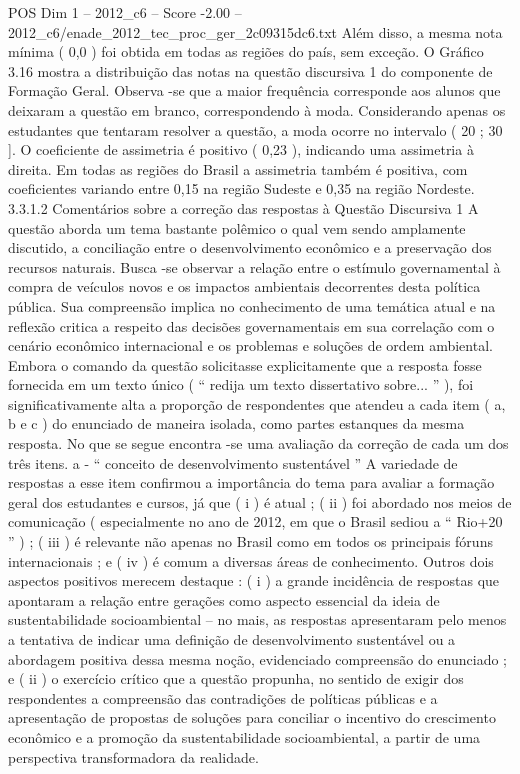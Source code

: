 \begin{textsample}{POS Dim 1 – 2012\_c6 – Score -2.00 – 2012\_c6/enade\_2012\_tec\_proc\_ger\_2c09315dc6.txt}
Além disso, a mesma nota mínima ( 0,0 ) foi obtida em todas as regiões do país, sem exceção.
O Gráfico 3.16 mostra a distribuição das notas na questão discursiva 1 do componente de Formação Geral.
Observa -se que a maior frequência corresponde aos alunos que deixaram a questão em branco, correspondendo à moda.
Considerando apenas os estudantes que tentaram resolver a questão, a moda ocorre no intervalo ( 20 ; 30 ].
O coeficiente de assimetria é positivo ( 0,23 ), indicando uma assimetria à direita.
Em todas as regiões do Brasil a assimetria também é positiva, com coeficientes variando entre 0,15 na região Sudeste e 0,35 na região Nordeste. 3.3.1.2 Comentários sobre a correção das respostas à Questão Discursiva 1 A questão aborda um tema bastante polêmico o qual vem sendo amplamente discutido, a conciliação entre o desenvolvimento econômico e a preservação dos recursos naturais.
Busca -se observar a relação entre o estímulo governamental à compra de veículos novos e os impactos ambientais decorrentes desta política pública.
Sua compreensão implica no conhecimento de uma temática atual e na reflexão critica a respeito das decisões governamentais em sua correlação com o cenário econômico internacional e os problemas e soluções de ordem ambiental.
Embora o comando da questão solicitasse explicitamente que a resposta fosse fornecida em um texto único ( “ redija um texto dissertativo sobre... ” ), foi significativamente alta a proporção de respondentes que atendeu a cada item ( a, b e c ) do enunciado de maneira isolada, como partes estanques da mesma resposta.
No que se segue encontra -se uma avaliação da correção de cada um dos três itens. a - “ conceito de desenvolvimento sustentável ” A variedade de respostas a esse item confirmou a importância do tema para avaliar a formação geral dos estudantes e cursos, já que ( i ) é atual ; ( ii ) foi abordado nos meios de comunicação ( especialmente no ano de 2012, em que o Brasil sediou a “ Rio+20 ” ) ; ( iii ) é relevante não apenas no Brasil como em todos os principais fóruns internacionais ; e ( iv ) é comum a diversas áreas de conhecimento.
Outros dois aspectos positivos merecem destaque : ( i ) a grande incidência de respostas que apontaram a relação entre gerações como aspecto essencial da ideia de sustentabilidade socioambiental – no mais, as respostas apresentaram pelo menos a tentativa de indicar uma definição de desenvolvimento sustentável ou a abordagem positiva dessa mesma noção, evidenciado compreensão do enunciado ; e ( ii ) o exercício crítico que a questão propunha, no sentido de exigir dos respondentes a compreensão das contradições de políticas públicas e a apresentação de propostas de soluções para conciliar o incentivo do crescimento econômico e a promoção da sustentabilidade socioambiental, a partir de uma perspectiva transformadora da realidade.

\end{textsample}
